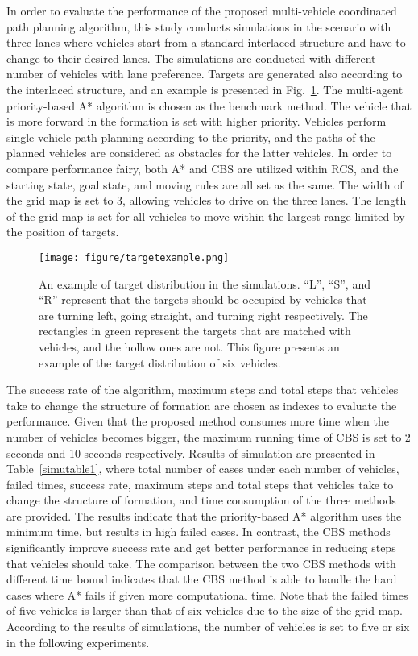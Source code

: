 \documentclass[journal]{IEEEtranTIE}
\begin{document}
In order to evaluate the performance of the proposed multi-vehicle coordinated path planning algorithm, this study conducts simulations in the scenario with three lanes where vehicles start from a standard interlaced structure and have to change to their desired lanes. The simulations are conducted with different number of vehicles with lane preference. Targets are generated also according to the interlaced structure, and an example is presented in Fig.~\ref{targetexample}. The multi-agent priority-based A* algorithm is chosen as the benchmark method. The vehicle that is more forward in the formation is set with higher priority. Vehicles perform single-vehicle path planning according to the priority, and the paths of the planned vehicles are considered as obstacles for the latter vehicles. In order to compare performance fairy, both A* and CBS are utilized within RCS, and the starting state, goal state, and moving rules are all set as the same. The width of the grid map is set to 3, allowing vehicles to drive on the three lanes. The length of the grid map is set for all vehicles to move within the largest range limited by the position of targets. 

\begin{figure}
\begin{center}
    \texttt{[image: figure/targetexample.png]}
    \caption{An example of target distribution in the simulations. ``L'', ``S'', and ``R'' represent that the targets should be occupied by vehicles that are turning left, going straight, and turning right respectively. The rectangles in green represent the targets that are matched with vehicles, and the hollow ones are not. This figure presents an example of the target distribution of six vehicles.}
    \label{targetexample}
\end{center}
\end{figure}

The success rate of the algorithm, maximum steps and total steps that vehicles take to change the structure of formation are chosen as indexes to evaluate the performance. Given that the proposed method consumes more time when the number of vehicles becomes bigger, the maximum running time of CBS is set to 2 seconds and 10 seconds respectively. Results of simulation are presented in Table~\ref{simutable1}, where total number of cases under each number of vehicles, failed times, success rate, maximum steps and total steps that vehicles take to change the structure of formation, and time consumption of the three methods are provided. The results indicate that the priority-based A* algorithm uses the minimum time, but results in high failed cases. In contrast, the CBS methods significantly improve success rate and get better performance in reducing steps that vehicles should take. The comparison between the two CBS methods with different time bound indicates that the CBS method is able to handle the hard cases where A* fails if given more computational time. Note that the failed times of five vehicles is larger than that of six vehicles due to the size of the grid map. According to the results of simulations, the number of vehicles is set to five or six in the following experiments. 
\end{document}
